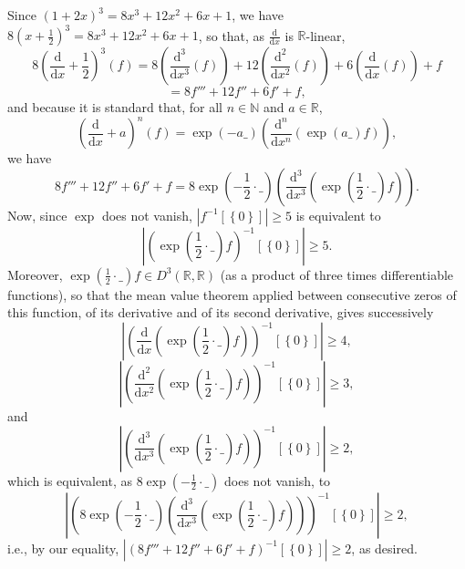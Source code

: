 \begin{solution}
    Since \( \left(1+2x\right)^3 = 8x^3+12x^2+6x+1 \), we have \( 8\left(x+\frac{1}{2}\right)^3 = 8x^3+12x^2+6x+1 \), so that, as \( \frac{\mathrm{d}}{\mathrm{d}x} \) is \( \mathbb{R} \)-linear,
    \[
        8\left(\frac{\mathrm{d}}{\mathrm{d}x}+\frac{1}{2}\right)^3\left(f\right) = 8\left(\frac{\mathrm{d}^3}{\mathrm{d}x^3}\left(f\right)\right) + 12\left(\frac{\mathrm{d}^2}{\mathrm{d}x^2}\left(f\right)\right) + 6\left(\frac{\mathrm{d}}{\mathrm{d}x}\left(f\right)\right) + f
    \]
    \[
        = 8f'''+12f''+6f'+f,
    \]
    and because it is standard that, for all \( n \in \mathbb{N} \) and \( a \in \mathbb{R} \),
    \[
        \left(\frac{\mathrm{d}}{\mathrm{d}x}+a\right)^n\left(f\right) = \exp\left(-a\_\right) \left(\frac{\mathrm{d}^n}{\mathrm{d}x^n}\left(\exp\left(a\_\right)f\right)\right),
    \]
    we have
    \[
        8f'''+12f''+6f'+f = 8\exp\left(-\frac{1}{2}\cdot\_\right) \left(\frac{\mathrm{d}^3}{\mathrm{d}x^3} \left(\exp\left(\frac{1}{2}\cdot\_\right)f\right)\right).
    \]
    Now, since \( \exp \) does not vanish, \( \left|f^{-1}\left[\left\{0\right\}\right]\right| \geq 5 \) is equivalent to
    \[
        \left|\left(\exp\left(\frac{1}{2}\cdot\_\right)f\right)^{-1} \left[\left\{0\right\}\right]\right| \geq 5.
    \]
    Moreover, \( \exp\left(\frac{1}{2}\cdot\_\right)f \in D^3\left(\mathbb{R},\mathbb{R}\right) \) (as a product of three times differentiable functions), so that the mean value theorem applied between consecutive zeros of this function, of its derivative and of its second derivative, gives successively
    \[
        \left|\left(\frac{\mathrm{d}}{\mathrm{d}x} \left(\exp\left(\frac{1}{2}\cdot\_\right)f\right)\right)^{-1} \left[\left\{0\right\}\right]\right| \geq 4,
    \]
    \[
        \left|\left(\frac{\mathrm{d}^2}{\mathrm{d}x^2} \left(\exp\left(\frac{1}{2}\cdot\_\right)f\right)\right)^{-1} \left[\left\{0\right\}\right]\right| \geq 3,
    \]
    and
    \[
        \left|\left(\frac{\mathrm{d}^3}{\mathrm{d}x^3} \left(\exp\left(\frac{1}{2}\cdot\_\right)f\right)\right)^{-1} \left[\left\{0\right\}\right]\right| \geq 2,
    \]
    which is equivalent, as \( 8\exp\left(-\frac{1}{2}\cdot\_\right) \) does not vanish, to
    \[
        \left|\left(8\exp\left(-\frac{1}{2}\cdot\_\right) \left(\frac{\mathrm{d}^3}{\mathrm{d}x^3} \left(\exp\left(\frac{1}{2}\cdot\_\right)f\right)\right)\right)^{-1} \left[\left\{0\right\}\right]\right| \geq 2,
    \]
    i.e., by our equality, \( \left|\left(8f'''+12f''+6f'+f\right)^{-1} \left[\left\{0\right\}\right]\right| \geq 2 \), as desired.
\end{solution}
